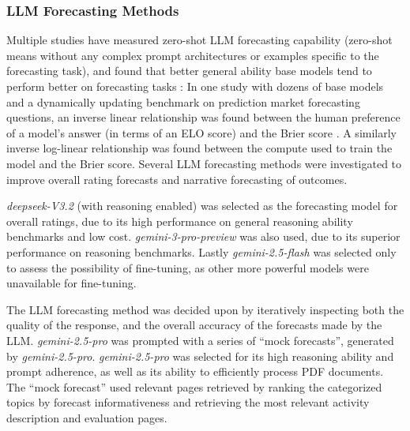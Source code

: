 \subsubsection{LLM Forecasting Methods}


Multiple studies have measured zero-shot LLM forecasting capability (zero-shot means without any complex prompt architectures or examples specific to the forecasting task), and found that better general ability base models tend to perform better on forecasting tasks \citep{halawiApproachingHumanLevelForecasting2024} \citep{kargerForecastBenchDynamicBenchmark2024}: In one study with dozens of base models and a dynamically updating benchmark on prediction market forecasting questions, an inverse linear relationship was found between the human preference of a model's answer (in terms of an ELO score) and the Brier score \citep{kargerForecastBenchDynamicBenchmark2024}. A similarly inverse log-linear relationship was found between the compute used to train the model and the Brier score.
Several LLM forecasting methods were investigated to improve overall rating forecasts and narrative forecasting of outcomes.


\emph{deepseek-V3.2} (with reasoning enabled) was selected as the forecasting model for overall ratings, due to its high performance on general reasoning ability benchmarks and low cost. \emph{gemini-3-pro-preview} was also used, due to its superior performance on reasoning benchmarks. Lastly \emph{gemini-2.5-flash
} was selected only to assess the possibility of fine-tuning, as other more powerful models were unavailable for fine-tuning.
 
The LLM forecasting method was decided upon by iteratively inspecting both the quality of the response, and the overall accuracy of the forecasts made by the LLM. \emph{gemini-2.5-pro} was prompted with a series of ``mock forecasts'', generated by \emph{gemini-2.5-pro}. \emph{gemini-2.5-pro} was selected for its high reasoning ability and prompt adherence, as well as its ability to efficiently process PDF documents.  The ``mock forecast'' used relevant pages retrieved by ranking the categorized topics by forecast informativeness and retrieving the most relevant activity description and evaluation pages.

